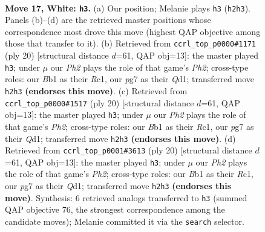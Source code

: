 \documentclass[11pt]{article}
\begin{document}
\clearpage

\begin{figure}[p]\centering
\begin{subfigure}{0.46\textwidth}\centering
\resizebox{\linewidth}{!}{%
\newchessgame
\chessboard[
  setfen={rn1qr1k1/pp1bbppp/4pn2/2Pp4/N2P4/P4N2/1P1B1PPP/1BRQR1K1 w - - 1 17},
  showmover=false,
  pgfstyle=straightmove, color=movearrow, markmove={h2-h3}
]}
\caption{}
\end{subfigure}\hfill
\begin{subfigure}{0.46\textwidth}\centering
\resizebox{\linewidth}{!}{%
\newchessgame
\chessboard[
  setfen={r1bqr1k1/1p1nbppp/p1p2n2/3p2B1/3P4/2NBPN2/PP3PPP/2RQ1RK1 w - - 2 11},
  showmover=false,
  pgfstyle=straightmove, color=movearrow, markmove={h2-h3}
]}
\caption{}
\end{subfigure}
\\[4pt]
\begin{subfigure}{0.46\textwidth}\centering
\resizebox{\linewidth}{!}{%
\newchessgame
\chessboard[
  setfen={r1bqr1k1/1p1nbppp/p1p2n2/3p2B1/3P4/2NBPN2/PP3PPP/2RQ1RK1 w - - 2 11},
  showmover=false,
  pgfstyle=straightmove, color=movearrow, markmove={h2-h3}
]}
\caption{}
\end{subfigure}\hfill
\begin{subfigure}{0.46\textwidth}\centering
\resizebox{\linewidth}{!}{%
\newchessgame
\chessboard[
  setfen={r1bqr1k1/1p1nbppp/p1p2n2/3p2B1/3P4/2NBPN2/PP3PPP/2RQ1RK1 w - - 2 11},
  showmover=false,
  pgfstyle=straightmove, color=movearrow, markmove={h2-h3}
]}
\caption{}
\end{subfigure}
\caption{\textbf{Move 17, White: \texttt{h3}.} (a) Our position; Melanie plays \texttt{h3} (\texttt{h2h3}). Panels (b)--(d) are the retrieved master positions whose correspondence most drove this move (highest QAP objective among those that transfer to it). (b) Retrieved from \texttt{ccrl\_top\_p0000\#1171} (ply 20) [structural distance $d$=61, QAP obj=13]: the master played \texttt{h3}; under $\mu$ our \emph{Ph2} plays the role of that game's \emph{Ph2}; cross-type roles: our \emph{B}b1 as their \emph{R}c1, our \emph{p}g7 as their \emph{Q}d1; transferred move \texttt{h2h3} \textbf{(endorses this move)}. (c) Retrieved from \texttt{ccrl\_top\_p0000\#1517} (ply 20) [structural distance $d$=61, QAP obj=13]: the master played \texttt{h3}; under $\mu$ our \emph{Ph2} plays the role of that game's \emph{Ph2}; cross-type roles: our \emph{B}b1 as their \emph{R}c1, our \emph{p}g7 as their \emph{Q}d1; transferred move \texttt{h2h3} \textbf{(endorses this move)}. (d) Retrieved from \texttt{ccrl\_top\_p0001\#3613} (ply 20) [structural distance $d$=61, QAP obj=13]: the master played \texttt{h3}; under $\mu$ our \emph{Ph2} plays the role of that game's \emph{Ph2}; cross-type roles: our \emph{B}b1 as their \emph{R}c1, our \emph{p}g7 as their \emph{Q}d1; transferred move \texttt{h2h3} \textbf{(endorses this move)}. Synthesis: 6 retrieved analogs transferred to \texttt{h3} (summed QAP objective 76, the strongest correspondence among the candidate moves); Melanie committed it via the \texttt{search} selector.}
\label{fig:thought-m32}
\end{figure}
\end{document}
